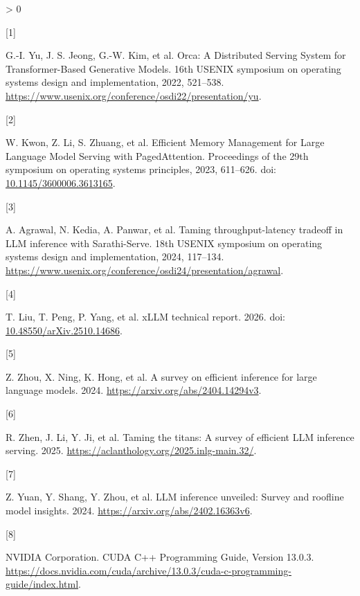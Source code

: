 \documentclass[
  11pt,
  UTF8]{ctexart}
\newlength{\cslhangindent}
\newlength{\csllabelwidth}
\newenvironment{CSLReferences}[2] %
 {%
  \setlength{\parindent}{0pt}
  \ifodd #1 \everypar{\setlength{\hangindent}{\cslhangindent}}\ignorespaces\fi
  \ifnum #2 > 0
  \setlength{\parskip}{#2\baselineskip}
  \fi
 }%
 {}
\newcommand{\CSLLeftMargin}[1]{\parbox[t]{\csllabelwidth}{#1}}
\newcommand{\CSLRightInline}[1]{\parbox[t]{\linewidth - \csllabelwidth}{#1}\break}
\begin{document}
\hypertarget{refs}{}
\begin{CSLReferences}{0}{0}
\leavevmode{}%
\CSLLeftMargin{{[}1{]} }
\CSLRightInline{G.-I. Yu, J. S. Jeong, G.-W. Kim, et al. {Orca: A
Distributed Serving System for Transformer-Based Generative Models}.
16th USENIX symposium on operating systems design and implementation,
2022, 521--538.
\url{https://www.usenix.org/conference/osdi22/presentation/yu}.}

\leavevmode{}%
\CSLLeftMargin{{[}2{]} }
\CSLRightInline{W. Kwon, Z. Li, S. Zhuang, et al. {Efficient Memory
Management for Large Language Model Serving with PagedAttention}.
Proceedings of the 29th symposium on operating systems principles, 2023,
611--626. doi:
\href{https://doi.org/10.1145/3600006.3613165}{10.1145/3600006.3613165}.}

\leavevmode{}%
\CSLLeftMargin{{[}3{]} }
\CSLRightInline{A. Agrawal, N. Kedia, A. Panwar, et al. Taming
throughput-latency tradeoff in {LLM} inference with {Sarathi-Serve}.
18th USENIX symposium on operating systems design and implementation,
2024, 117--134.
\url{https://www.usenix.org/conference/osdi24/presentation/agrawal}.}

\leavevmode{}%
\CSLLeftMargin{{[}4{]} }
\CSLRightInline{T. Liu, T. Peng, P. Yang, et al. xLLM technical report.
2026. doi:
\href{https://doi.org/10.48550/arXiv.2510.14686}{10.48550/arXiv.2510.14686}.}

\leavevmode{}%
\CSLLeftMargin{{[}5{]} }
\CSLRightInline{Z. Zhou, X. Ning, K. Hong, et al. A survey on efficient
inference for large language models. 2024.
\url{https://arxiv.org/abs/2404.14294v3}.}

\leavevmode{}%
\CSLLeftMargin{{[}6{]} }
\CSLRightInline{R. Zhen, J. Li, Y. Ji, et al. Taming the titans: A
survey of efficient LLM inference serving. 2025.
\url{https://aclanthology.org/2025.inlg-main.32/}.}

\leavevmode{}%
\CSLLeftMargin{{[}7{]} }
\CSLRightInline{Z. Yuan, Y. Shang, Y. Zhou, et al. LLM inference
unveiled: Survey and roofline model insights. 2024.
\url{https://arxiv.org/abs/2402.16363v6}.}

\leavevmode{}%
\CSLLeftMargin{{[}8{]} }
\CSLRightInline{NVIDIA Corporation. {CUDA C++ Programming Guide, Version
13.0.3}.
\url{https://docs.nvidia.com/cuda/archive/13.0.3/cuda-c-programming-guide/index.html}.}


\end{CSLReferences}
\end{document}
